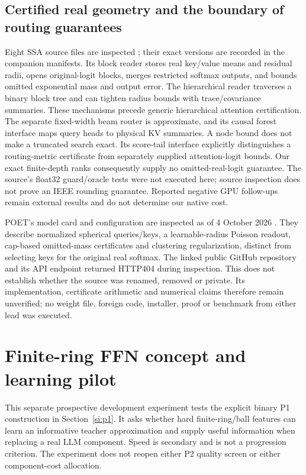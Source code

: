 \documentclass[11pt]{article}
\begin{document}
\subsection{Certified real geometry and the boundary of routing guarantees}
\label{app:certified-code}

Eight SSA source files are inspected \citep{ssasource}; their exact versions
are recorded in the companion manifests.
Its block reader stores real key/value means and residual radii, opens
original-logit blocks, merges restricted softmax outputs, and bounds omitted
exponential mass and output error. The hierarchical reader traverses a binary
block tree and can tighten radius bounds with trace/covariance summaries.
These mechanisms precede generic hierarchical attention certification.
The separate fixed-width beam router is approximate, and its causal forest
interface maps query heads to physical KV summaries. A node bound does not make
a truncated search exact. Its score-tail interface explicitly distinguishes
a routing-metric certificate from separately supplied attention-logit bounds.
Our exact finite-depth ranks consequently supply no omitted-real-logit
guarantee. The source's float32 guard/oracle tests were not executed here;
source inspection does not prove an IEEE rounding guarantee. Reported negative
GPU follow-ups remain external results and do not determine our native cost.

POET's model card and configuration are inspected as of 4 October 2026
\citep{poetmodel}. They describe normalized spherical
queries/keys, a learnable-radius Poisson readout, cap-based omitted-mass
certificates and clustering regularization, distinct from selecting keys for
the original real softmax. The linked public GitHub repository and its API
endpoint returned HTTP404 during inspection. This does not establish whether
the source was renamed, removed or private. Its implementation, certificate
arithmetic and numerical claims therefore remain unverified; no weight file,
foreign code, installer, proof or benchmark from either lead was executed.


\clearpage
\section{Finite-ring FFN concept and learning pilot}
\label{app:ball-ffn-results}

This separate prospective development experiment tests the explicit binary
P1 construction in Section~\ref{si:p1}. It asks whether hard finite-ring/ball
features can learn an informative teacher approximation and supply useful
information when replacing a real LLM component. Speed is secondary and is
not a progression criterion. The experiment does not reopen either P2 quality
screen or either component-cost allocation.
\end{document}
